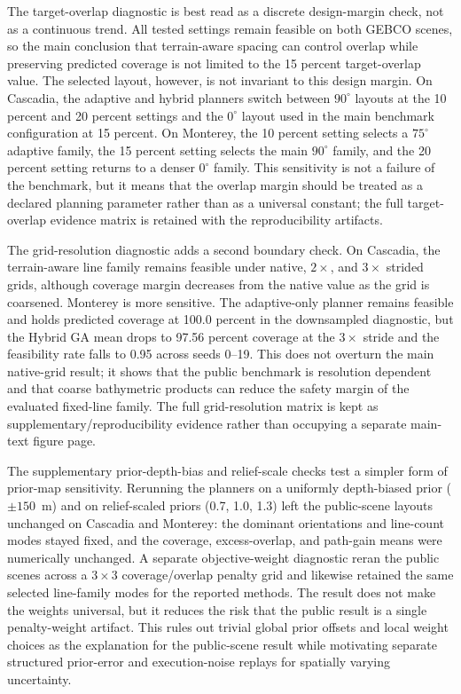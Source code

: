 \documentclass[jmse,article,submit,moreauthors]{Definitions/mdpi}
\begin{document}
The target-overlap diagnostic is best read as a discrete design-margin check, not as a continuous trend. All tested settings remain feasible on both GEBCO scenes, so the main conclusion that terrain-aware spacing can control overlap while preserving predicted coverage is not limited to the 15 percent target-overlap value. The selected layout, however, is not invariant to this design margin. On Cascadia, the adaptive and hybrid planners switch between $90^{\circ}$ layouts at the 10 percent and 20 percent settings and the $0^{\circ}$ layout used in the main benchmark configuration at 15 percent. On Monterey, the 10 percent setting selects a $75^{\circ}$ adaptive family, the 15 percent setting selects the main $90^{\circ}$ family, and the 20 percent setting returns to a denser $0^{\circ}$ family. This sensitivity is not a failure of the benchmark, but it means that the overlap margin should be treated as a declared planning parameter rather than as a universal constant; the full target-overlap evidence matrix is retained with the reproducibility artifacts.

The grid-resolution diagnostic adds a second boundary check. On Cascadia, the terrain-aware line family remains feasible under native, \(2\times\), and \(3\times\) strided grids, although coverage margin decreases from the native value as the grid is coarsened. Monterey is more sensitive. The adaptive-only planner remains feasible and holds predicted coverage at 100.0 percent in the downsampled diagnostic, but the Hybrid GA mean drops to 97.56 percent coverage at the \(3\times\) stride and the feasibility rate falls to 0.95 across seeds 0--19. This does not overturn the main native-grid result; it shows that the public benchmark is resolution dependent and that coarse bathymetric products can reduce the safety margin of the evaluated fixed-line family. The full grid-resolution matrix is kept as supplementary/reproducibility evidence rather than occupying a separate main-text figure page.

The supplementary prior-depth-bias and relief-scale checks test a simpler form of prior-map sensitivity. Rerunning the planners on a uniformly depth-biased prior (\(\pm 150\)~m) and on relief-scaled priors (0.7, 1.0, 1.3) left the public-scene layouts unchanged on Cascadia and Monterey: the dominant orientations and line-count modes stayed fixed, and the coverage, excess-overlap, and path-gain means were numerically unchanged. A separate objective-weight diagnostic reran the public scenes across a \(3\times3\) coverage/overlap penalty grid and likewise retained the same selected line-family modes for the reported methods. The result does not make the weights universal, but it reduces the risk that the public result is a single penalty-weight artifact. This rules out trivial global prior offsets and local weight choices as the explanation for the public-scene result while motivating separate structured prior-error and execution-noise replays for spatially varying uncertainty.
\end{document}
